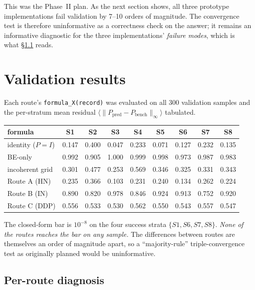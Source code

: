 \documentclass[11pt]{article}
\begin{document}
This was the Phase~II plan. As the next section shows, all three
prototype implementations fail validation by 7--10 orders of
magnitude. The convergence test is therefore uninformative as a
correctness check on the answer; it remains an informative diagnostic
for the three implementations' \emph{failure modes}, which is what
\S\ref{sec:per-route-diag} reads.

\section{Validation results}

Each route's \texttt{formula\_X(record)} was evaluated on all 300
validation samples and the per-stratum mean residual
$\langle \|P_{\text{pred}}-P_{\text{bench}}\|_\infty \rangle$ tabulated.

\begin{center}\small
\begin{tabular}{lcccccccc}
\toprule
formula            & S1     & S2     & S3     & S4     & S5     & S6     & S7     & S8     \\
\midrule
identity ($P=I$)   & 0.147  & 0.400  & 0.047  & 0.233  & 0.071  & 0.127  & 0.232  & 0.135  \\
BE-only            & 0.992  & 0.905  & 1.000  & 0.999  & 0.998  & 0.973  & 0.987  & 0.983  \\
incoherent grid    & 0.301  & 0.477  & 0.253  & 0.569  & 0.346  & 0.325  & 0.331  & 0.343  \\
\midrule
Route A (HN)       & 0.235  & 0.366  & 0.103  & 0.231  & 0.240  & 0.134  & 0.262  & 0.224  \\
Route B (IN)       & 0.890  & 0.820  & 0.978  & 0.846  & 0.924  & 0.913  & 0.752  & 0.920  \\
Route C (DDP)      & 0.556  & 0.533  & 0.530  & 0.562  & 0.550  & 0.543  & 0.557  & 0.547  \\
\bottomrule
\end{tabular}
\end{center}

The closed-form bar is $10^{-8}$ on the four success strata $\{S1,S6,S7,S8\}$.
\emph{None of the routes reaches the bar on any sample.} The differences
between routes are themselves an order of magnitude apart, so a
``majority-rule'' triple-convergence test as originally planned would be
uninformative.

\subsection{Per-route diagnosis}
\label{sec:per-route-diag}
\end{document}

